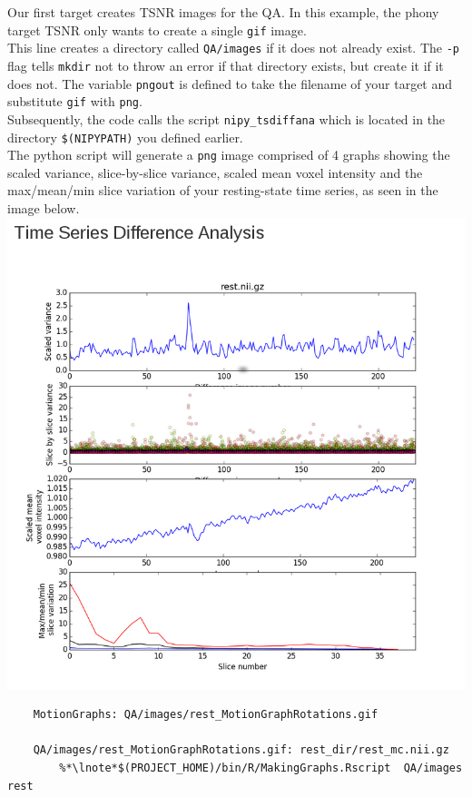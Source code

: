 \noindent{} Our first target creates TSNR images for the QA. In this example, the phony target TSNR only wants \maken{} to create a single \texttt{gif} image. \\
 This line creates a directory called \texttt{QA/images} if it does not already exist. The \texttt{-p} flag tells \texttt{mkdir} not to throw an error if that directory exists, but create it if it does not.
 The variable \texttt{pngout} is defined to take the filename of your target and substitute \texttt{gif} with \texttt{png}.\\
 Subsequently, the code calls the script \texttt{nipy\_tsdiffana} which is located in the directory \texttt{\$(NIPYPATH)} you defined earlier.\\ The python script will generate a \texttt{png} image comprised of 4 graphs showing the scaled variance, slice-by-slice variance, scaled mean voxel intensity and the max/mean/min slice variation of your resting-state time series, as seen in the image below. \\

\includegraphics[scale=0.5]{images/QAtsdiffana.png}

\begin{lstlisting}
	MotionGraphs: QA/images/rest_MotionGraphRotations.gif 

	QA/images/rest_MotionGraphRotations.gif: rest_dir/rest_mc.nii.gz
		%*\lnote*$(PROJECT_HOME)/bin/R/MakingGraphs.Rscript  QA/images rest
\end{lstlisting}

